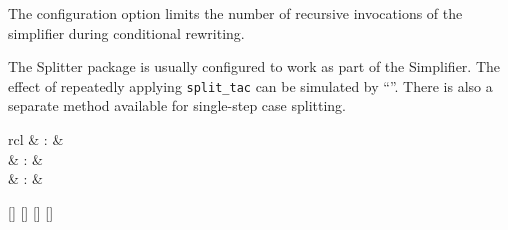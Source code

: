 \begin{isabellebody}
\begin{isamarkuptext}
  The configuration option  limits the number of
  recursive invocations of the simplifier during conditional
  rewriting.

  \medskip The Splitter package is usually configured to work as part
  of the Simplifier.  The effect of repeatedly applying \verb|split_tac| can be simulated by ``''.  There is also a separate 
  method available for single-step case splitting.%
\end{isamarkuptext}%
\isamarkuptrue%
%
\isamarkuptrue%
%
\begin{isamarkuptext}%
\begin{matharray}{rcl}
    \hypertarget{command.print-simpset}{\hyperlink{command.print-simpset}{\mbox{}}} & : &  \\
    \hypertarget{attribute.simp}{\hyperlink{attribute.simp}{\mbox{}}} & : &  \\
    \hypertarget{attribute.split}{\hyperlink{attribute.split}{\mbox{}}} & : &  \\
  \end{matharray}

  \begin{railoutput}
\rail@bar
{}[]
[]
\rail@endbar
\rail@bar
{}
[]
[]
\rail@endbar
\rail@end
\end{railoutput}



\end{isamarkuptext}
\end{isabellebody}
